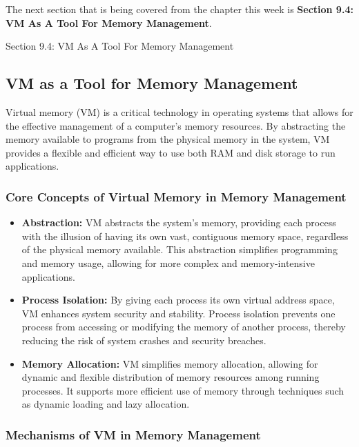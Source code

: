 The next section that is being covered from the chapter this week is \textbf{Section 9.4: VM As A Tool For Memory Management}.

\begin{notes}{Section 9.4: VM As A Tool For Memory Management}
    \subsection*{VM as a Tool for Memory Management}

    Virtual memory (VM) is a critical technology in operating systems that allows for the effective management of a computer's memory resources. By abstracting the memory available to programs from 
    the physical memory in the system, VM provides a flexible and efficient way to use both RAM and disk storage to run applications.
    
    \subsubsection*{Core Concepts of Virtual Memory in Memory Management}
    
    \begin{itemize}
        \item \textbf{Abstraction:} VM abstracts the system's memory, providing each process with the illusion of having its own vast, contiguous memory space, regardless of the physical memory available. 
        This abstraction simplifies programming and memory usage, allowing for more complex and memory-intensive applications.
        \item \textbf{Process Isolation:} By giving each process its own virtual address space, VM enhances system security and stability. Process isolation prevents one process from accessing or modifying 
        the memory of another process, thereby reducing the risk of system crashes and security breaches.
        \item \textbf{Memory Allocation:} VM simplifies memory allocation, allowing for dynamic and flexible distribution of memory resources among running processes. It supports more efficient use of 
        memory through techniques such as dynamic loading and lazy allocation.
    \end{itemize}
    
    \subsubsection*{Mechanisms of VM in Memory Management}
    

\end{notes}
